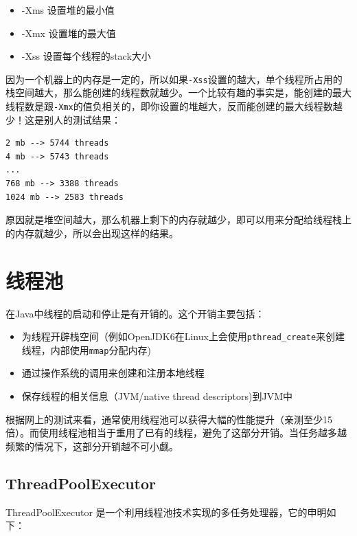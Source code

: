 \documentclass[12pt]{article}
\begin{document}
\begin{itemize}
\tightlist
\item
  -Xms 设置堆的最小值
\item
  -Xmx 设置堆的最大值
\item
  -Xss 设置每个线程的stack大小
\end{itemize}

因为一个机器上的内存是一定的，所以如果\texttt{-Xss}设置的越大，单个线程所占用的栈空间越大，那么能创建的线程数就越少。一个比较有趣的事实是，能创建的最大线程数是跟\texttt{-Xmx}的值负相关的，即你设置的堆越大，反而能创建的最大线程数越少！这是别人的测试结果：

\begin{verbatim}
2 mb --> 5744 threads
4 mb --> 5743 threads
...
768 mb --> 3388 threads
1024 mb --> 2583 threads
\end{verbatim}

原因就是堆空间越大，那么机器上剩下的内存就越少，即可以用来分配给线程栈上的内存就越少，所以会出现这样的结果。

\section{线程池}\label{ux7ebfux7a0bux6c60}

在Java中线程的启动和停止是有开销的。这个开销主要包括：

\begin{itemize}
\tightlist
\item
  为线程开辟栈空间（例如OpenJDK6在Linux上会使用\texttt{pthread\_create}来创建线程，内部使用\texttt{mmap}分配内存)
\item
  通过操作系统的调用来创建和注册本地线程
\item
  保存线程的相关信息（JVM/native thread descriptors)到JVM中
\end{itemize}

根据网上的测试来看，通常使用线程池可以获得大幅的性能提升（亲测至少15倍）。而使用线程池相当于重用了已有的线程，避免了这部分开销。当任务越多越频繁的情况下，这部分开销越不可小觑。

\subsection{ThreadPoolExecutor}\label{threadpoolexecutor}

ThreadPoolExecutor 是一个利用线程池技术实现的多任务处理器，它的申明如下：
\end{document}
